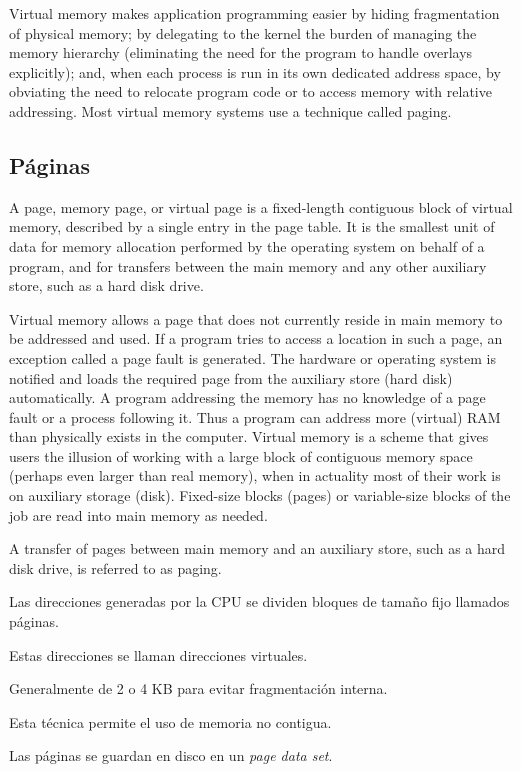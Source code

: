 \documentclass[a4paper, twoside]{article}
\begin{document}
Virtual memory makes application programming easier by hiding fragmentation of
physical memory; by delegating to the kernel the burden of managing the memory
hierarchy (eliminating the need for the program to handle overlays explicitly);
and, when each process is run in its own dedicated address space, by obviating
the need to relocate program code or to access memory with relative addressing.
Most virtual memory systems use a technique called paging.

\subsection{Páginas}

A page, memory page, or virtual page is a fixed-length contiguous block of
virtual memory, described by a single entry in the page table.
It is the smallest unit of data for memory allocation performed by the
operating system on behalf of a program, and for transfers between the main
memory and any other auxiliary store, such as a hard disk drive.

Virtual memory allows a page that does not currently reside in main memory to
be addressed and used.
If a program tries to access a location in such a page, an exception called a
page fault is generated.
The hardware or operating system is notified and loads the required page from
the auxiliary store (hard disk) automatically.
A program addressing the memory has no knowledge of a page fault or a process
following it.
Thus a program can address more (virtual) RAM than physically exists in the
computer.
Virtual memory is a scheme that gives users the illusion of working with a
large block of contiguous memory space (perhaps even larger than real memory),
when in actuality most of their work is on auxiliary storage (disk).
Fixed-size blocks (pages) or variable-size blocks of the job are read into main
memory as needed.

A transfer of pages between main memory and an auxiliary store, such as a hard
disk drive, is referred to as paging.

Las direcciones generadas por la CPU se dividen bloques de tamaño fijo llamados
páginas.

Estas direcciones se llaman direcciones virtuales.

Generalmente de 2 o 4 KB para evitar fragmentación interna.

Esta técnica permite el uso de memoria no contigua.

Las páginas se guardan en disco en un \emph{page data set}.
\end{document}
